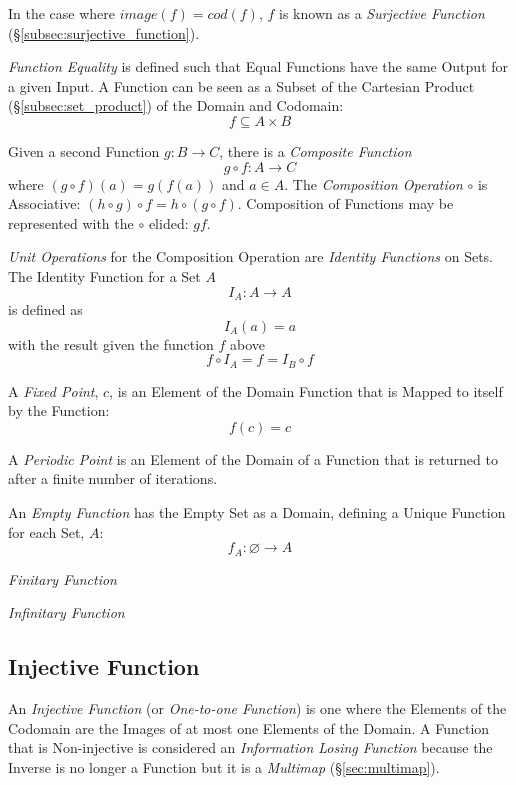\documentclass{article}
\begin{document}
In the case where $image(f) = cod(f)$, $f$ is known as a
\emph{Surjective Function} (\S\ref{subsec:surjective_function}).

\emph{Function Equality} is defined such that Equal Functions have the
same Output for a given Input. A Function can be seen as a Subset of
the Cartesian Product (\S\ref{subsec:set_product}) of the Domain and
Codomain:
\[
    f \subseteq A \times B
\]

Given a second Function $g : B \rightarrow C$, there is a
\emph{Composite Function}
\[
    g \circ f : A \rightarrow C
\]
where $(g \circ f)(a) = g(f(a))$ and $a \in A$. The \emph{Composition
  Operation} $\circ$ is Associative: $(h \circ g) \circ f = h \circ (g
\circ f)$. Composition of Functions may be represented with the
$\circ$ elided: $gf$.

\emph{Unit Operations} for the Composition Operation are
\emph{Identity Functions} on Sets. The Identity Function for a Set $A$
\[
    I_A : A \rightarrow A
\]
is defined as
\[
    I_A(a) = a
\]
with the result given the function $f$ above
\[
    f \circ I_A = f = I_B \circ f
\]

A \emph{Fixed Point}, $c$, is an Element of the Domain Function that
is Mapped to itself by the Function:
\[
    f(c) = c
\]

A \emph{Periodic Point} is an Element of the Domain of a Function that
is returned to after a finite number of iterations.

An \emph{Empty Function} has the Empty Set as a Domain, defining a
Unique Function for each Set, $A$:
\[
    f_A : \varnothing \rightarrow A
\]

\emph{Finitary Function}

\emph{Infinitary Function}



\subsection{Injective Function}\label{subsec:injective_function}

An \emph{Injective Function} (or \emph{One-to-one Function}) is one
where the Elements of the Codomain are the Images of at most one
Elements of the Domain. A Function that is Non-injective is considered
an \emph{Information Losing Function} because the Inverse is no longer
a Function but it is a \emph{Multimap} (\S\ref{sec:multimap}).
\end{document}
